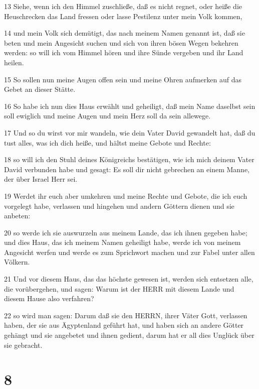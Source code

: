 \par 13 Siehe, wenn ich den Himmel zuschließe, daß es nicht regnet, oder heiße die Heuschrecken das Land fressen oder lasse Pestilenz unter mein Volk kommen,
\par 14 und mein Volk sich demütigt, das nach meinem Namen genannt ist, daß sie beten und mein Angesicht suchen und sich von ihren bösen Wegen bekehren werden: so will ich vom Himmel hören und ihre Sünde vergeben und ihr Land heilen.
\par 15 So sollen nun meine Augen offen sein und meine Ohren aufmerken auf das Gebet an dieser Stätte.
\par 16 So habe ich nun dies Haus erwählt und geheiligt, daß mein Name daselbst sein soll ewiglich und meine Augen und mein Herz soll da sein allewege.
\par 17 Und so du wirst vor mir wandeln, wie dein Vater David gewandelt hat, daß du tust alles, was ich dich heiße, und hältst meine Gebote und Rechte:
\par 18 so will ich den Stuhl deines Königreichs bestätigen, wie ich mich deinem Vater David verbunden habe und gesagt: Es soll dir nicht gebrechen an einem Manne, der über Israel Herr sei.
\par 19 Werdet ihr euch aber umkehren und meine Rechte und Gebote, die ich euch vorgelegt habe, verlassen und hingehen und andern Göttern dienen und sie anbeten:
\par 20 so werde ich sie auswurzeln aus meinem Lande, das ich ihnen gegeben habe; und dies Haus, das ich meinem Namen geheiligt habe, werde ich von meinem Angesicht werfen und werde es zum Sprichwort machen und zur Fabel unter allen Völkern.
\par 21 Und vor diesem Haus, das das höchste gewesen ist, werden sich entsetzen alle, die vorübergehen, und sagen: Warum ist der HERR mit diesem Lande und diesem Hause also verfahren?
\par 22 so wird man sagen: Darum daß sie den HERRN, ihrer Väter Gott, verlassen haben, der sie aus Ägyptenland geführt hat, und haben sich an andere Götter gehängt und sie angebetet und ihnen gedient, darum hat er all dies Unglück über sie gebracht.

\chapter{8}

